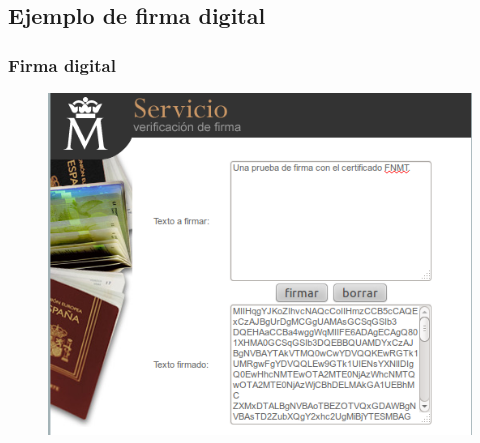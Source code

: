 \documentclass{beamer}
\begin{document}

\subsection{Ejemplo de firma digital}

\begin{frame}
\frametitle{Firma digital}

\begin{figure}
	\begin{center}
	\includegraphics[scale=0.40,clip=true]{figs/firma.png} 	
	\end{center}
\end{figure}

\end{frame}


\end{document}
